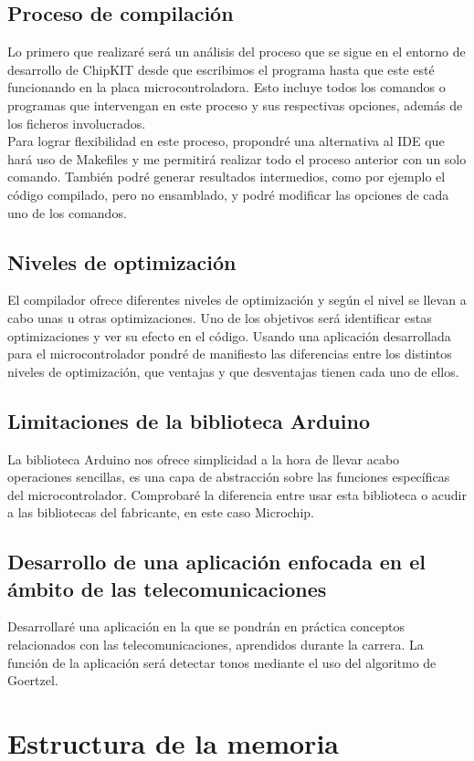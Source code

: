 \subsection{Proceso de compilación}
Lo primero que realizaré será un análisis del proceso que se sigue en el entorno de desarrollo de ChipKIT desde que escribimos el programa hasta que este esté funcionando en la placa microcontroladora.  Esto incluye todos los comandos o programas que intervengan en este proceso y sus respectivas opciones, además de los ficheros involucrados.\\
Para lograr flexibilidad en este proceso, propondré una alternativa al IDE que hará uso de Makefiles y me permitirá realizar todo el proceso anterior con un solo comando. También podré generar resultados intermedios, como por ejemplo el código compilado, pero no ensamblado, y podré modificar las opciones de cada uno de los comandos.

\subsection{Niveles de optimización}
El compilador ofrece diferentes niveles de optimización y según el nivel se llevan a cabo unas u otras optimizaciones. Uno de los objetivos será identificar estas optimizaciones y ver su efecto en el código. Usando una aplicación desarrollada para el microcontrolador pondré de manifiesto las diferencias entre los distintos niveles de optimización, que ventajas y que desventajas tienen cada uno de ellos.

\subsection{Limitaciones de la biblioteca Arduino}
La biblioteca Arduino nos ofrece simplicidad a la hora de llevar acabo operaciones sencillas, es una capa de abstracción sobre las funciones específicas del microcontrolador. Comprobaré la diferencia entre usar esta biblioteca o acudir a las bibliotecas del fabricante, en este caso Microchip.

\subsection{Desarrollo de una aplicación enfocada en el ámbito de las telecomunicaciones}
Desarrollaré una aplicación en la que se pondrán en práctica conceptos relacionados con las telecomunicaciones, aprendidos durante la carrera. La función de la aplicación será detectar tonos mediante el uso del algoritmo de Goertzel.

\section{Estructura de la memoria}